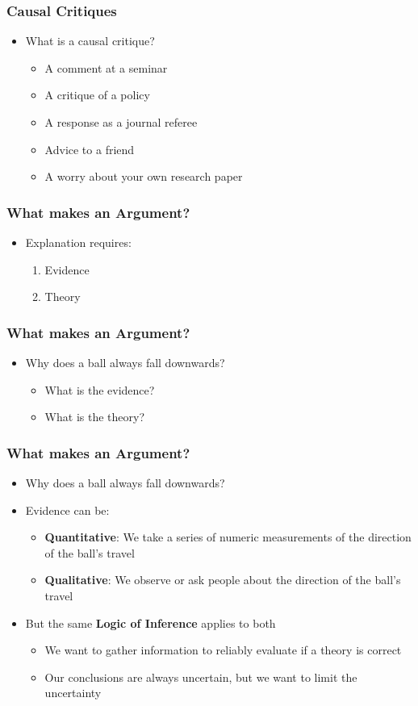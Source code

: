 \documentclass[xcolor=x11names,compress]{beamer}\usepackage[]{graphicx}\usepackage[]{color}
\renewcommand{\(}{\begin{columns}}
\renewcommand{\)}{\end{columns}}
\newcommand{\<}[1]{\begin{column}{#1}}
\renewcommand{\>}{\end{column}}
\begin{document}
\begin{frame}
\frametitle{Causal Critiques}
\begin{itemize}
\item What is a causal critique?
\begin{itemize}
\item A comment at a seminar
\item A critique of a policy
\item A response as a journal referee
\item Advice to a friend
\item A worry about your own research paper
\end{itemize}
\end{itemize}
\end{frame}

\begin{frame}
\frametitle{What makes an Argument?}
\begin{itemize}
\item  Explanation requires:
\begin{enumerate}
\item  Evidence
\item  Theory
\end{enumerate}
\end{itemize}
\end{frame}

\begin{frame}
\frametitle{What makes an Argument?}
\begin{itemize}
\item Why does a ball always fall downwards?
\begin{itemize}
\item What is the evidence?
\pause
\item What is the theory?
\end{itemize}
\end{itemize}
\end{frame}

\begin{frame}
\frametitle{What makes an Argument?}
\begin{itemize}
\item Why does a ball always fall downwards?
\item Evidence can be:
\begin{itemize}
\item \textbf{Quantitative}: We take a series of numeric measurements of the direction of the ball's travel
\item \textbf{Qualitative}: We observe or ask people about the direction of the ball's travel
\end{itemize}
\item But the same \textbf{Logic of Inference} applies to both
\begin{itemize}
\item We want to gather information to reliably evaluate if a theory is correct
\item Our conclusions are always uncertain, but we want to limit the uncertainty
\end{itemize}
\end{itemize}
\end{frame}
\end{document}
